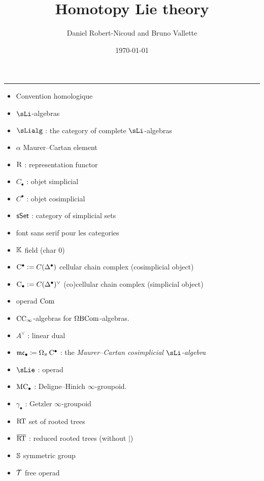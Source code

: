 \documentclass[twoside, 10pt]{amsart}
\author{Daniel Robert-Nicoud and Bruno Vallette}
\date{}
\title{Homotopy Lie theory}
\date{\today}
\begin{document}
\maketitle

\setcounter{tocdepth}{1}

\begin{abstract}
\end{abstract}


\tableofcontents

\hrule
\begin{itemize}
\item Convention homologique
\item $\sLi$-algebras
\item $\sLialg$ : the category of complete $\sLi$-algebras
\item $\alpha$ Maurer--Cartan element
\item $\mathrm{R}$ : representation functor 
\item $C_\bullet$ : objet simplicial
\item $C^\bullet$ : objet cosimplicial
\item $\mathsf{sSet}$ : category of simplicial sets 
\item font sans serif pour les categories 
\item $\mathbb{K}$ field (char $0$)
\item $\mathrm{C}^\bullet:=C(\mathrm{\Delta}^{\bullet})$ cellular chain complex (cosimplicial object)
\item $\mathrm{C}_\bullet:=C(\mathrm{\Delta}^{\bullet})^\vee$ (co)cellular chain complex (simplicial object)
\item operad $\mathrm{Com}$
\item $\mathrm{CC}_\infty$-algebras for $\Omega \mathrm{B} \mathrm{Com}$-algebras. 
\item $A^\vee$ : linear dual
\item $\mathfrak{mc}_\bullet\coloneqq \Omega_\pi \, \mathrm{C}^\bullet$ : the \emph{Maurer--Cartan cosimplicial $\sLi$-algebra}
\item $\sLie$ : operad
\item $\mathrm{MC}_\bullet$ : Deligne--Hinich $\infty$-groupoid. 
\item $\gamma_\bullet$ : Getzler $\infty$-groupoid
\item $\mathrm{RT}$ set of rooted trees
\item $\overline{\mathrm{RT}}$ : reduced rooted trees (without $|$)
\item $\mathbb{S}$ symmetric group
\item $\mathcal{T}$ free operad

\end{itemize}
\end{document}
